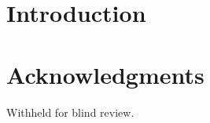 \documentclass{sigchi}
\date{\today}
\title{}
\begin{document}
\title{\plaintitle}

\author{%
  \\
}

\maketitle

\begin{abstract}
Abstract to come...
\end{abstract}

%
% 

\keywords{\plainkeywords}

\section{Introduction}
\label{sec:orgfd9b920}

\section{Acknowledgments}
\label{sec:org7627cb1}

Withheld for blind review.

\balance{}


\end{document}
